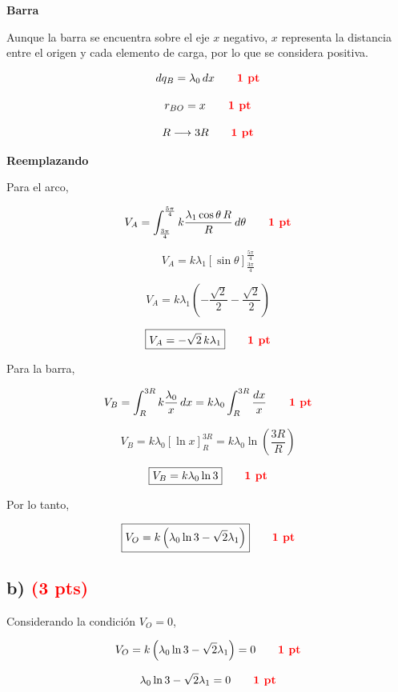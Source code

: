 \documentclass[12pt]{article}
\begin{document}
\textbf{Barra}

Aunque la barra se encuentra sobre el eje $x$ negativo, $x$ representa
la distancia entre el origen y cada elemento de carga, por lo que se
considera positiva.

\[
dq_B=\lambda_0\,dx
\qquad
\textcolor{red}{\textbf{1 pt}}
\]

\[
r_{BO}=x
\qquad
\textcolor{red}{\textbf{1 pt}}
\]

\[
R\longrightarrow3R
\qquad
\textcolor{red}{\textbf{1 pt}}
\]

\vspace{0.4cm}

\textbf{Reemplazando}

Para el arco,

\[
V_A
=
\int_{\frac{3\pi}{4}}^{\frac{5\pi}{4}}
k\frac{\lambda_1\cos\theta\,R}{R}\,d\theta
\qquad
\textcolor{red}{\textbf{1 pt}}
\]

\[
V_A
=
k\lambda_1
\left[
\sin\theta
\right]_{\frac{3\pi}{4}}^{\frac{5\pi}{4}}
\]

\[
V_A
=
k\lambda_1
\left(
-\frac{\sqrt{2}}{2}
-
\frac{\sqrt{2}}{2}
\right)
\]

\[
\boxed{
V_A=-\sqrt{2}\,k\lambda_1
}
\qquad
\textcolor{red}{\textbf{1 pt}}
\]

Para la barra,

\[
V_B
=
\int_R^{3R}
k\frac{\lambda_0}{x}\,dx
=
k\lambda_0
\int_R^{3R}\frac{dx}{x}
\qquad
\textcolor{red}{\textbf{1 pt}}
\]

\[
V_B
=
k\lambda_0
\left[
\ln x
\right]_R^{3R}
=
k\lambda_0
\ln\left(\frac{3R}{R}\right)
\]

\[
\boxed{
V_B=k\lambda_0\ln3
}
\qquad
\textcolor{red}{\textbf{1 pt}}
\]

Por lo tanto,

\[
\boxed{
V_O
=
k\left(
\lambda_0\ln3-\sqrt{2}\lambda_1
\right)
}
\qquad
\textcolor{red}{\textbf{1 pt}}
\]


\subsection*{b) \hfill \textcolor{red}{\textbf{(3 pts)}}}

Considerando la condición $V_O=0$,

\[
V_O
=
k\left(
\lambda_0\ln3-\sqrt{2}\lambda_1
\right)
=
0
\qquad
\textcolor{red}{\textbf{1 pt}}
\]

\[
\lambda_0\ln3-\sqrt{2}\lambda_1=0
\qquad
\textcolor{red}{\textbf{1 pt}}
\]
\end{document}
